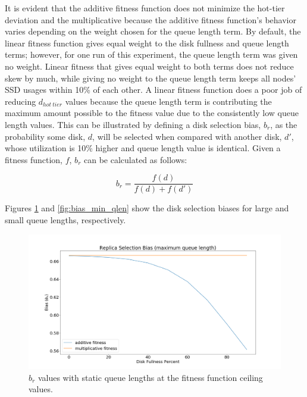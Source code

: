 \documentclass[12pt]{article}
\begin{document}
    \FloatBarrier

    It is evident that the additive fitness function does not minimize the
    hot-tier deviation and the multiplicative because the additive fitness
    function's behavior varies depending on the weight chosen for the queue
    length term. By default, the linear fitness function
    gives equal weight to the disk fullness and queue length terms;
    however, for one run of this experiment, the queue length term was given no
    weight. Linear fitness that gives equal weight to both terms does not
    reduce skew by much, while giving no weight to the queue length term
    keeps all nodes' SSD usages within 10\% of each other. A linear fitness
    function does a poor job of reducing $d_{hot\ tier}$ values because the
    queue length term is contributing the maximum amount possible to the
    fitness value due to the consistently low queue length values. This can be
    illustrated by defining a disk selection bias, $b_r$, as the probability
    some disk, $d$, will be selected when compared with another disk, $d'$,
    whose utilization is 10\% higher and queue length value is identical. Given
    a fitness function, $f$, $b_r$ can be calculated as follows:

    \begin{equation}
      b_r = \frac{f(d)}{f(d) + f(d')}
    \end{equation}

    Figures \ref{fig:bias_max_qlen} and \ref{fig:bias_min_qlen} show the disk
    selection biases for large and small queue lengths, respectively.

    \begin{figure}[htbp]
      \centering
      \includegraphics[scale=0.32]{images/replica_selection_bias_max_qlen.png} 
      \caption{$b_r$ values with static queue lengths at the fitness
               function ceiling values.}
      \label{fig:bias_max_qlen}
    \end{figure}
\end{document}
